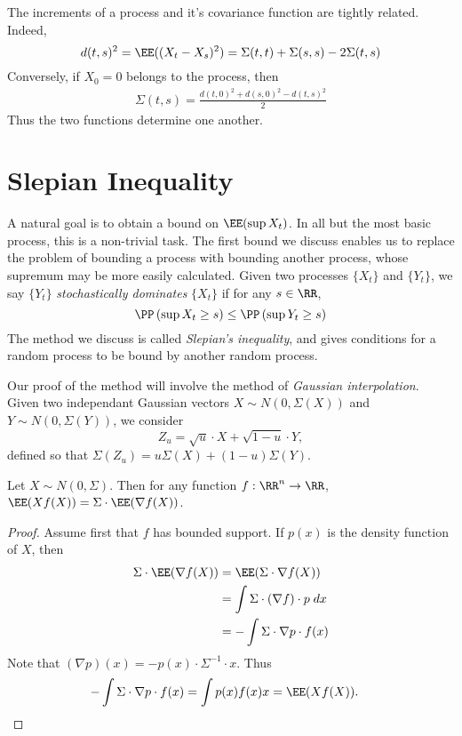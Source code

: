 The increments of a process and it's covariance function are tightly related. Indeed,
%
\[ d(t,s)^2 = \EE((X_t - X_s)^2) = \Sigma(t,t) + \Sigma(s,s) - 2 \Sigma(t,s) \]
%
Conversely, if $X_0 = 0$ belongs to the process, then
%
\begin{align*}
    \Sigma(t,s) = \frac{d(t,0)^2 + d(s,0)^2 - d(t,s)^2}{2}
\end{align*}
%
Thus the two functions determine one another.

\section{Slepian Inequality}

A natural goal is to obtain a bound on $\EE(\sup X_t)$. In all but the most basic process, this is a non-trivial task. The first bound we discuss enables us to replace the problem of bounding a process with bounding another process, whose supremum may be more easily calculated. Given two processes $\{ X_t \}$ and $\{ Y_t \}$, we say $\{ Y_t \}$ {\it stochastically dominates} $\{ X_t \}$ if for any $s \in \RR$,
%
\[ \PP \left( \sup X_t \geq s \right) \leq \PP \left( \sup Y_t \geq s \right) \]
%
The method we discuss is called {\it Slepian's inequality}, and gives conditions for a random process to be bound by another random process.

Our proof of the method will involve the method of {\it Gaussian interpolation}. Given two independant Gaussian vectors $X \sim N(0,\Sigma(X))$ and $Y \sim N(0,\Sigma(Y))$, we consider
%
\[ Z_u = \sqrt{u} \cdot X + \sqrt{1-u} \cdot Y, \]
%
defined so that $\Sigma(Z_u) = u \Sigma(X) + (1 - u) \Sigma(Y)$.

\begin{lemma}
    Let $X \sim N(0,\Sigma)$. Then for any function $f: \RR^n \to \RR$, $\EE(Xf(X)) = \Sigma \cdot \EE(\nabla f(X))$.
\end{lemma}
\begin{proof}
    Assume first that $f$ has bounded support. If $p(x)$ is the density function of $X$, then
    \begin{align*}
        \Sigma \cdot \EE(\nabla f(X)) &= \EE(\Sigma \cdot \nabla f(X))\\
        &= \int \Sigma \cdot (\nabla f) \cdot p\; dx\\
        &= - \int \Sigma \cdot \nabla p \cdot f(x)
    \end{align*}
    Note that $(\nabla p)(x) = -p(x) \cdot \Sigma^{-1} \cdot x$. Thus
    \begin{align*}
        - \int \Sigma \cdot \nabla p \cdot f(x) &= \int p(x) f(x) x = \EE(Xf(X)). \qedhere
    \end{align*}
\end{proof}


